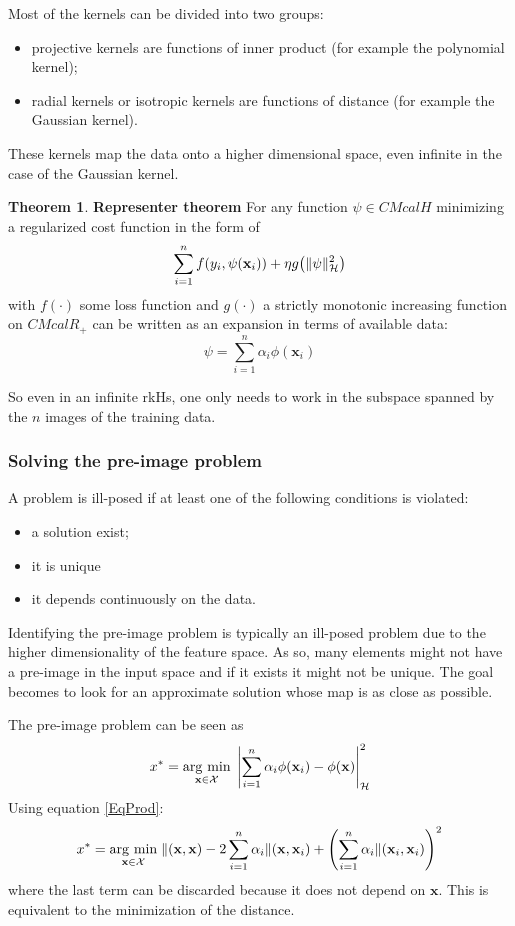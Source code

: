 \documentclass[12pt, letterpaper]{article}
\theoremstyle{definition}
\newcommand{\x}{\mathbf{x}}
\DeclarePairedDelimiter\autobracket{(}{)}
\newcommand{\br}[1]{\autobracket*{#1}}
\newtheorem{theorem}{Theorem}
\newcommand{\argmin}[1]{\underset{#1}{\operatorname{arg}\,\operatorname{min}}\;}
\let\tb\textbf
\begin{document}
Most of the kernels can be divided into two groups:
\begin{itemize}
\item projective kernels are functions of inner product (for example the polynomial kernel);
\item radial kernels or isotropic kernels are functions of distance (for example the Gaussian kernel).
\end{itemize}
These kernels map the data onto a higher dimensional space, even infinite in the case of the Gaussian kernel.
\begin{theorem}{\tb{Representer theorem}}
For any function $\psi \in CMcal{H}$ minimizing a regularized cost function in the form of
\begin{equation}
\sum_{i=1}^n f\br{y_i, \psi(\x_i)} + \eta g\br{\|\psi\|^2_\CMcal{H}}
\end{equation}
with $f(\cdot)$ some loss function and $g(\cdot)$ a strictly monotonic increasing function on $CMcal{R}_{+}$ can be written as an expansion in terms of available data:
\begin{equation}
\psi = \sum_{i=1}^n \alpha_i \phi(\x_i)
\end{equation} 
\end{theorem}
So even in an infinite rkHs, one only needs to work in the subspace spanned by the $n$ images of the training data.

\subsubsection{Solving the pre-image problem}
A problem is ill-posed if at least one of the following conditions is violated:
\begin{itemize}
\item a solution exist;
\item it is unique 
\item it depends continuously on the data.
\end{itemize}
Identifying the pre-image problem is typically an ill-posed problem due to the higher dimensionality of the feature space. As so, many elements might not have a pre-image in the input space and if it exists it might not be unique. The goal becomes to look for an approximate solution whose map is as close as possible.

The pre-image problem can be seen as 
\begin{equation}
x^* = \argmin{\x \in \CMcal{X}} \left| \sum_{i=1}^n \alpha_i \phi(\x_i) - \phi(\x)\right|^2_{\CMcal{H}}
\end{equation}
Using equation \autoref{EqProd}:
\begin{equation}
\label{MinFunct}
x^* = \argmin{\x \in \CMcal{X}} \CMcal{k}(\x,\x) -2 \sum_{i=1}^n \alpha_i \CMcal{k}(\x,\x_i) + \br{\sum_{i=1}^n \alpha_i \CMcal{k}(\x_i,\x_i)}^2
\end{equation}
where the last term can be discarded because it does not depend on $\x$. This is equivalent to the minimization of the distance.
\end{document}
